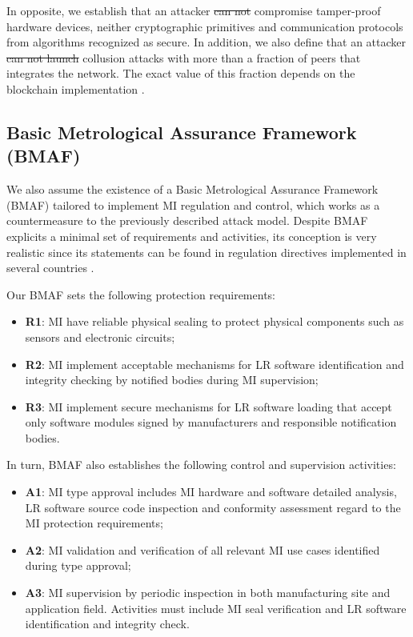 \documentclass[journal]{IEEEtran}
\providecommand{\DIFadd}[1]{{\protect\color{blue}\uwave{#1}}} %
\providecommand{\DIFdel}[1]{{\protect\color{red}\sout{#1}}}                      %
\providecommand{\DIFaddbegin}{} %
\providecommand{\DIFaddend}{} %
\providecommand{\DIFdelbegin}{} %
\providecommand{\DIFdelend}{} %
\begin{document}
In opposite, we establish that an attacker \DIFdelbegin \DIFdel{can not }\DIFdelend \DIFaddbegin \DIFadd{cannot }\DIFaddend compromise tamper-proof hardware devices, neither cryptographic primitives and communication protocols from algorithms recognized as secure. In addition, we also define that an attacker \DIFdelbegin \DIFdel{can not launch }\DIFdelend \DIFaddbegin \DIFadd{cannot take part of }\DIFaddend collusion attacks with more than a fraction of peers that integrates the network. The exact value of this fraction depends on the blockchain implementation \cite{Vukolic2016}. %

\subsection{Basic Metrological Assurance Framework (BMAF)}
We also assume the existence of a Basic Metrological Assurance Framework (BMAF) tailored to implement MI regulation and control, which works as a countermeasure to the  previously described attack model. Despite BMAF explicits a minimal set of requirements and activities, its conception is very realistic since its statements can be found in regulation directives implemented in several countries \cite{Esche2015,Camara2012,Boccardo2014,Luchsinger2008}.

Our BMAF sets the following protection requirements:
 \begin{itemize} 
 \item \textbf{R1}: MI have reliable physical sealing to protect physical components such as sensors and electronic circuits;
 \item \textbf{R2}: MI implement acceptable mechanisms for LR software identification and integrity checking by notified bodies during MI supervision;
 \item \textbf{R3}: MI implement secure mechanisms for LR software loading that accept only software modules signed by manufacturers and responsible notification bodies.
 \end{itemize} 

In turn, BMAF also establishes the following control and supervision activities:
 \begin{itemize} 
 \item \textbf{A1}: MI type approval includes MI hardware and software detailed analysis, LR software source code inspection and conformity assessment regard to the MI protection requirements;
 \item \textbf{A2}: MI validation and verification of all relevant MI use cases identified during type approval;
 \item \textbf{A3}: MI supervision by periodic inspection in both manufacturing site and application field. Activities must include MI seal verification and LR software identification and integrity check.
 \end{itemize} 
\end{document}
